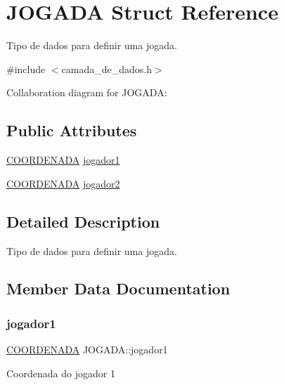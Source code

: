 \hypertarget{structJOGADA}{}\section{J\+O\+G\+A\+DA Struct Reference}
\label{structJOGADA}


Tipo de dados para definir uma jogada.  




{\ttfamily \#include $<$camada\+\_\+de\+\_\+dados.\+h$>$}



Collaboration diagram for J\+O\+G\+A\+DA\+:
\subsection*{Public Attributes}
\begin{DoxyCompactItemize}
\item 
\hyperlink{structCOORDENADA}{C\+O\+O\+R\+D\+E\+N\+A\+DA} \hyperlink{structJOGADA_a93d9306cb0c49b66b7d9a615bffe0149}{jogador1}
\item 
\hyperlink{structCOORDENADA}{C\+O\+O\+R\+D\+E\+N\+A\+DA} \hyperlink{structJOGADA_ab46b16dfbdc7f2af9430c8dcdac0914b}{jogador2}
\end{DoxyCompactItemize}


\subsection{Detailed Description}
Tipo de dados para definir uma jogada. 

\subsection{Member Data Documentation}
\mbox{\label{structJOGADA_a93d9306cb0c49b66b7d9a615bffe0149}} 
\subsubsection{\texorpdfstring{jogador1}{jogador1}}
{\footnotesize\ttfamily \hyperlink{structCOORDENADA}{C\+O\+O\+R\+D\+E\+N\+A\+DA} J\+O\+G\+A\+D\+A\+::jogador1}

Coordenada do jogador 1 \mbox{\label{structJOGADA_ab46b16dfbdc7f2af9430c8dcdac0914b}} 
